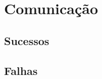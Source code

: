 \documentclass[12pt]{article}
\begin{document}
\newpage

\section*{Comunicação}

\subsection*{Sucessos}


\subsection*{Falhas}
\end{document}
